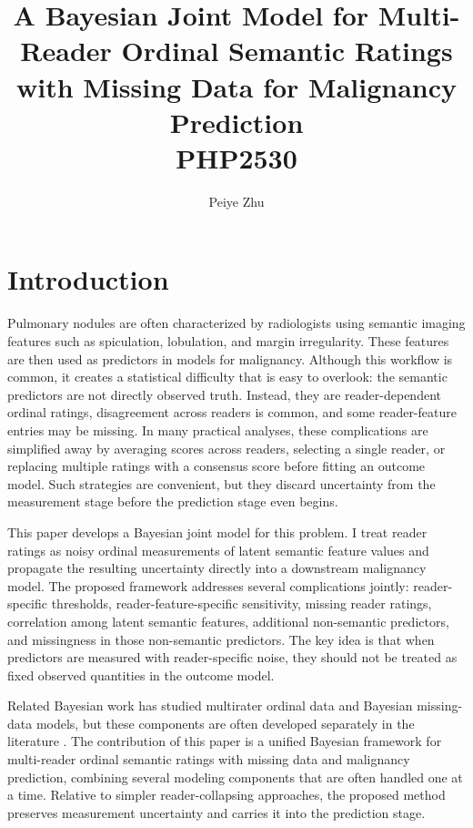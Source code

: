 \documentclass[twoside,11pt]{article}
\begin{document}
\title{
A Bayesian Joint Model for Multi-Reader Ordinal Semantic Ratings with Missing Data for Malignancy Prediction\\
\vspace{0.1in}
PHP2530
}

\author{Peiye Zhu}

\maketitle
\date{}

\section{Introduction}

Pulmonary nodules are often characterized by radiologists using semantic imaging features such as spiculation, lobulation, and margin irregularity. These features are then used as predictors in models for malignancy. Although this workflow is common, it creates a statistical difficulty that is easy to overlook: the semantic predictors are not directly observed truth. Instead, they are reader-dependent ordinal ratings, disagreement across readers is common, and some reader-feature entries may be missing. In many practical analyses, these complications are simplified away by averaging scores across readers, selecting a single reader, or replacing multiple ratings with a consensus score before fitting an outcome model. Such strategies are convenient, but they discard uncertainty from the measurement stage before the prediction stage even begins.

This paper develops a Bayesian joint model for this problem. I treat reader ratings as noisy ordinal measurements of latent semantic feature values and propagate the resulting uncertainty directly into a downstream malignancy model. The proposed framework addresses several complications jointly: reader-specific thresholds, reader-feature-specific sensitivity, missing reader ratings, correlation among latent semantic features, additional non-semantic predictors, and missingness in those non-semantic predictors. The key idea is that when predictors are measured with reader-specific noise, they should not be treated as fixed observed quantities in the outcome model.

Related Bayesian work has studied multirater ordinal data and Bayesian missing-data models, but these components are often developed separately in the literature \citep{Johnson1996,Rubin1976}. The contribution of this paper is a unified Bayesian framework for multi-reader ordinal semantic ratings with missing data and malignancy prediction, combining several modeling components that are often handled one at a time. Relative to simpler reader-collapsing approaches, the proposed method preserves measurement uncertainty and carries it into the prediction stage.
\end{document}
